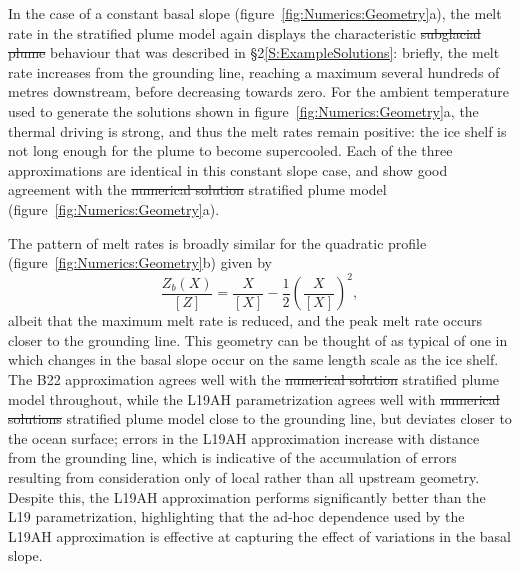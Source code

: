 \documentclass[openacc]{rsproca_new}%
\newcommand{\red}[1]{{\color{red} #1}}
\newcommand{\blue}[1]{{\color{blue} #1}}
\newcommand{\rout}[1]{\red{\st{#1}}}\newcommand{\ab}[1]{\textcolor{Green}{#1}}\newcommand{\about}[1]{\textcolor{Cyan}{\sout{#1}}}
\begin{document}
In the case of a constant basal slope (figure~\ref{fig:Numerics:Geometry}a), the melt rate \blue{in the stratified plume model} again displays the characteristic \rout{subglacial plume} behaviour that was described in \S2\ref{S:ExampleSolutions}: briefly, the melt rate increases from the grounding line, reaching a maximum several hundreds of metres downstream, before decreasing towards zero. For the ambient temperature used to generate the solutions shown in figure~\ref{fig:Numerics:Geometry}a, the thermal driving is strong, and thus the melt rates remain positive: the ice shelf is not long enough for the plume to become supercooled. Each of the three approximations are identical in this constant slope case, and show good agreement with the \rout{numerical solution }\blue{stratified plume model} (figure~\ref{fig:Numerics:Geometry}a).

The pattern of melt rates is broadly similar for the quadratic profile (figure~\ref{fig:Numerics:Geometry}b) given by
\begin{equation}\label{E:Numerics:QuadraticGeometry}
\frac{Z_b(X)}{\left[Z\right]}= \frac{X}{\left[X\right]} - \frac{1}{2}\left(\frac{X}{\left[X\right]}\right)^2,
\end{equation}
albeit that the maximum melt rate is reduced, and the peak melt rate occurs closer to the grounding line. This geometry can be thought of as typical of one in which changes in the basal slope occur on the same length scale as the ice shelf. The B22 approximation agrees well with the\rout{ numerical solution} \blue{stratified plume model} throughout, while the L19AH parametrization agrees well with\rout{ numerical solutions} \blue{stratified plume model} close to the grounding line, but deviates closer to the ocean surface; errors in the L19AH approximation increase with distance from the grounding line, which is indicative of the accumulation of errors resulting from consideration only of local rather than all upstream geometry. Despite this, the L19AH approximation performs significantly better than the L19 parametrization, highlighting that the ad-hoc dependence used by the L19AH approximation is effective at capturing the effect of variations in the basal slope.
\end{document}
